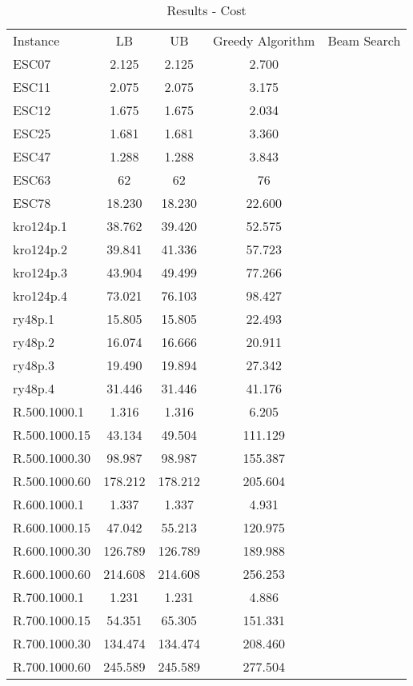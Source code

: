 \documentclass[crop=false]{standalone}
\begin{document}
\begin{table}[htb]
	\begin{tabular}{lcccc}
		Instance & LB & UB & Greedy Algorithm & Beam Search \\
		ESC07 & 2.125 & 2.125 & 2.700 & \\
		ESC11 & 2.075 & 2.075 & 3.175 & \\
		ESC12 & 1.675 & 1.675 & 2.034 & \\
		ESC25 & 1.681 & 1.681 & 3.360 & \\
		ESC47 & 1.288 & 1.288 & 3.843 & \\
		ESC63 & 62	  & 62    & 76 & \\
		ESC78 & 18.230 & 18.230 & 22.600 & \\
		kro124p.1 & 38.762 & 39.420 & 52.575 & \\
		kro124p.2 & 39.841 & 41.336 & 57.723 & \\
		kro124p.3 & 43.904 & 49.499 & 77.266 & \\
		kro124p.4 & 73.021 & 76.103 & 98.427 & \\
		ry48p.1   & 15.805 & 15.805 & 22.493 & \\
		ry48p.2   & 16.074 & 16.666 & 20.911 & \\
		ry48p.3   & 19.490 & 19.894 & 27.342 & \\
		ry48p.4   & 31.446 & 31.446 & 41.176 & \\
		R.500.1000.1  & 1.316   & 1.316 & 6.205 & \\
		R.500.1000.15 & 43.134  & 49.504 & 111.129 & \\
		R.500.1000.30 & 98.987  & 98.987 & 155.387 & \\
		R.500.1000.60 & 178.212 & 178.212 & 205.604 & \\
		R.600.1000.1  & 1.337   & 1.337 & 4.931 & \\
		R.600.1000.15 & 47.042  & 55.213 & 120.975 & \\
		R.600.1000.30 & 126.789 & 126.789 & 189.988 & \\
		R.600.1000.60 & 214.608 & 214.608 & 256.253 & \\
		R.700.1000.1  & 1.231   & 1.231 & 4.886 & \\
		R.700.1000.15 & 54.351  & 65.305 & 151.331 & \\
		R.700.1000.30 & 134.474 & 134.474 & 208.460 & \\
		R.700.1000.60 & 245.589 & 245.589 & 277.504 & \\
	\end{tabular}
	\caption{Results - Cost}
	\label{table:results_cost}
\end{table}
\end{document}
